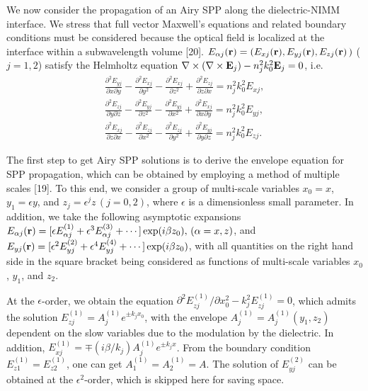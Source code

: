 \documentclass[aps,pra,preprint,groupedaddress,amsmath,amssymb,showpacs]{revtex4-1}
\begin{document}
\vskip 0.75cm

We now consider the propagation of an Airy SPP along the dielectric-NIMM interface.
We stress that full vector Maxwell's equations and related boundary conditions must be considered because the optical field is localized at the interface within a subwavelength
volume [20].  $E_{\alpha j}({\bf r})=(E_{xj}({\bf r}),E_{yj}({\bf r}),E_{zj}({\bf r})\,)$ ($j=1,2$)
satisfy the
Helmholtz equation $\nabla\times\left(\nabla\times{\bf E}_j\right)-n_j^2k_0^2{\bf E}_j=0$, i.e.
\begin{subequations}
\begin{eqnarray}
\frac{\partial^2E_{yj}}{\partial x\partial y}-\frac{\partial^2E_{xj}}{\partial y^2}-\frac{\partial^2E_{xj}}{\partial z^2}+\frac{\partial^2E_{zj}}{\partial z\partial x}=n_j^2k_0^2E_{xj},\label{equation for Ex}\\
\frac{\partial^2E_{zj}}{\partial y\partial z}-\frac{\partial^2E_{yj}}{\partial z^2}-\frac{\partial^2E_{yj}}{\partial x^2}+\frac{\partial^2E_{xj}}{\partial x\partial y}=n_j^2k_0^2E_{yj},\label{equation for Ey}\\
\frac{\partial^2E_{xj}}{\partial z\partial x}-\frac{\partial^2E_{zj}}{\partial x^2}-\frac{\partial^2E_{zj}}{\partial y^2}+\frac{\partial^2E_{yj}}{\partial y\partial z}=n_j^2k_0^2E_{zj}.\label{equation for Ez}
\end{eqnarray}
\end{subequations}
%

\vskip 0.75cm

The first step to get Airy SPP solutions is to derive the envelope equation for SPP propagation,
which can be obtained by employing a method of multiple scales [19]. To this end, we consider a group of multi-scale variables $x_0=x$, $y_1=\epsilon y$, and $z_{j}=\epsilon^{j}z\,(j=0,2)$, where $\epsilon$ is a dimensionless small parameter. In addition, we take the following asymptotic expansions $E_{\alpha j}({\bf r})=[\epsilon E^{(1)}_{\alpha j}+\epsilon^{3}E^{(3)}_{\alpha j}+\cdots]\exp(i\beta z_0),\,(\alpha=x,z)$, and
$ E_{yj}({\bf r})=[\epsilon^2 E^{(2)}_{yj}+\epsilon^{4}E^{(4)}_{yj}+\cdots]\exp(i\beta z_0)$,
with all quantities on the right hand side in the square bracket being considered as functions of multi-scale
variables $x_0$, $y_1$, and $z_2$.

\vskip 0.75cm

At the $\epsilon$-order, we obtain the equation
$\partial^2E^{(1)}_{zj}/\partial x_0^2-k_j^2E^{(1)}_{zj}=0$,
which admits the solution
$E^{(1)}_{zj}=A^{(1)}_je^{\pm k_{j}x_0}$, with the envelope $A^{(1)}_j=A^{(1)}_j(y_1,z_2)$ dependent on the slow variables due to the modulation by the dielectric. In addition, $E^{(1)}_{xj}=\mp (i\beta/k_j)A^{(1)}_je^{\pm k_{j}x}$. From the boundary condition $E^{(1)}_{z1}=E^{(1)}_{z2}$, one can get $A_1^{(1)}=A_2^{(1)}=A$. The solution of $E^{(2)}_{yj}$ can be obtained at the $\epsilon^2$-order, which is skipped here for saving space.
\end{document}
